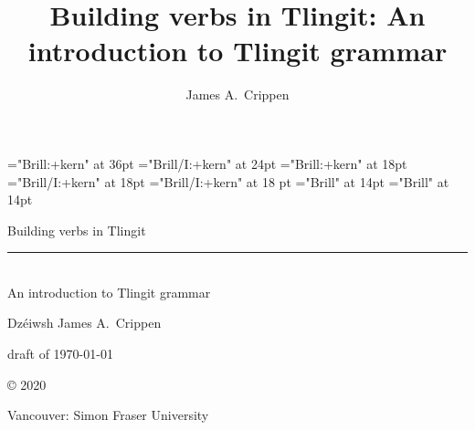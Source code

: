 
\thispagestyle{empty}

\title{Building verbs in Tlingit: An introduction to Tlingit grammar}
\author{James A.\ Crippen}


\font\titlefont="Brill:+kern" at 36pt
\font\subtitlefont="Brill/I:+kern" at 24pt
\font\authorfont="Brill:+kern" at 18pt
\font\authoritalfont="Brill/I:+kern" at 18pt
\font\authorandfont="Brill/I:+kern" at 18 pt
\font\datefont="Brill" at 14pt
\font\copyfont="Brill" at 14pt

\pagestyle{empty}

\vspace*{1em}
\begin{center}
\titlefont
Building verbs in Tlingit \\[0.125em]
\rule{0.75\textwidth}{0.4pt} \\[0.25em]
\subtitlefont
An introduction to Tlingit grammar
\end{center}
\normalfont

\begin{center}
\vspace*{3em}
\authoritalfont Dzéiwsh
\authorfont James A.\ Crippen
\end{center}
\normalfont

\begin{center}
\vspace*{18em}
\datefont
draft of \today
\end{center}
\normalfont

\vspace*{1em}
\begin{center}
\copyfont
© 2020 \theauthor
\end{center}

\vspace*{1em}
\begin{center}
Vancouver: Simon Fraser University
\end{center}